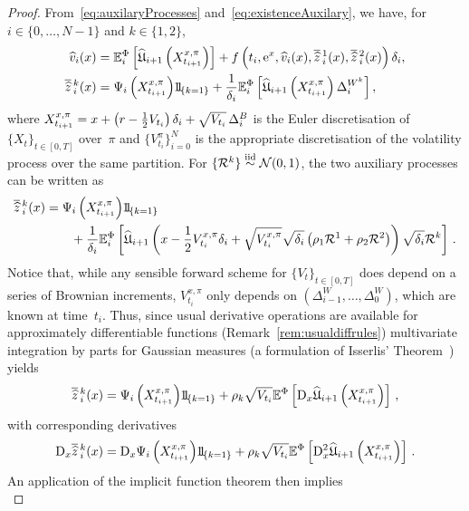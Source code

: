 \begin{proof}
From~\eqref{eq:auxilaryProcesses} and~\eqref{eq:existenceAuxilary}, we have, for $i\in\{0,\dots,N-1\}$ and $k\in\{1,2\}$,
    \begin{align*}
    \widehat{v}_{i}(x) &= \EE^\Phi_{i}\left[\widehat{\Uf}_{i+1}\left(X^{x,\pi}_{t_{i+1}}\right)\right] + f\left(t_i, \E^{x}, \widehat{v}_{i}(x), \zowO_{i}(x), \zowT_{i}(x)\right) \Deli, \\
    \zowk_{i}(x) &= \Psi_i\left(X^{x,\pi}_{t_{i+1}}\right)\ind_{\{k=1\}} + \frac{1}{\Deli} \EE^\Phi_{i}\left[\widehat{\Uf}_{i+1}\left(X^{x,\pi}_{t_{i+1}}\right) \Delta^{W^k}_{i}\right],
    \end{align*}
    where $X^{x,\pi}_{t_{i+1}} = x + \left(r- \frac12 V_{t_i}\right)\delta_{i}  + \sqrt{V_{t_i}}\,\Delta^{B}_{i}$ is 
    the Euler discretisation of $\{X_t\}_{t\in[0, T]}$ over~$\pi$ and $\{V^\pi_{t_i}\}_{i=0}^{N}$ is the appropriate discretisation of the volatility process over the same partition. 
    For $\{\mathcal{R}^k\}\overset{{\mathrm{iid}}}{\sim}\mathcal{N}(0,1)$, the two auxiliary processes can be written as
    \begin{align*}
        \zowk_{i}(x) 
        &= \Psi_i\left(X^{x,\pi}_{t_{i+1}}\right)\ind_{\{k=1\}} \\
        &\qquad + \frac{1}{\Deli} \EE^\Phi_{i}\left[\widehat{\Uf}_{i+1}\left(x - \frac{1}{2}V^{x,\pi}_{t_i}\Deli + \sqrt{V^{x,\pi}_{t_i}}\sqrt{\Deli}\left(\rho_1 \Rr^1 + \rho_2 \Rr^2\right)\right) \sqrt{\Deli} \Rr^k\right]\,.
    \end{align*}
    Notice that, while any sensible forward scheme for $\{V_t\}_{t\in[0,T]}$ does depend on a series of Brownian increments, $V^{x,\pi}_{t_i}$ only depends on $\left(\Delta^{W}_{i-1},\dots,\Delta^{W}_{0}\right)$, which are known at time~$t_i$. Thus, since usual derivative operations are available for approximately differentiable functions (Remark~\ref{rem:usualdiffrules}) multivariate integration by parts for Gaussian measures (a formulation of Isserlis' Theorem~\cite{Isserlis1918OnVariables}) yields
    $$
    \zowk_{i}(x) = \Psi_i\left(X^{x,\pi}_{t_{i+1}}\right)\ind_{\{k=1\}} + \rho_k\sqrt{V_{t_i}}\EE^\Phi\left[\Dx \widehat \Uf_{i+1}\left(X^{x, \pi}_{t_{i+1}}\right)\right]\,,
    $$
    with corresponding derivatives
    $$
    \Dx\zowk_{i}(x) = \Dx\Psi_i\left(X^{x,\pi}_{t_{i+1}}\right)\ind_{\{k=1\}} + \rho_k\sqrt{V_{t_i}}\EE^\Phi\left[\Dx^2 \widehat\Uf_{i+1}\left(X^{x,\pi}_{t_{i+1}}\right)\right]\,.
    $$
An application of the implicit function theorem then implies
\begin{equation}\label{eq:derivativeVhat}

\end{equation}
\end{proof}

